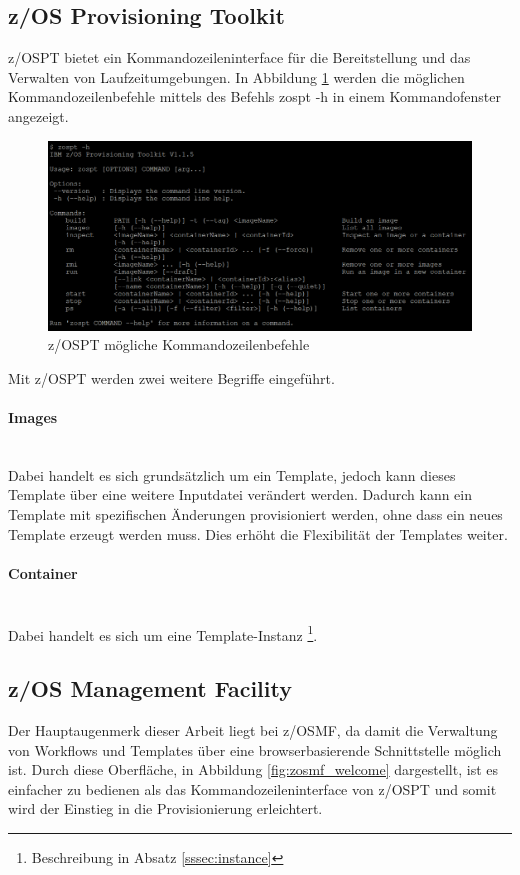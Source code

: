 \subsection{z/OS Provisioning Toolkit}\label{sssec:zospt}
z/OSPT bietet ein Kommandozeileninterface für die Bereitstellung und das Verwalten von Laufzeitumgebungen.
In Abbildung \ref{fig:zospt_help} werden die möglichen Kommandozeilenbefehle mittels des Befehls \glqq zospt -h\grqq{} in einem Kommandofenster angezeigt.
\begin{figure}[h]
	\centering
	\includegraphics[width=\textwidth]{figures/zospt_help_putty.png}
	\caption{z/OSPT mögliche Kommandozeilenbefehle}
	\label{fig:zospt_help}
\end{figure}
Mit z/OSPT werden zwei weitere Begriffe eingeführt.\\
\paragraph{\glqq Images\grqq}~\\
Dabei handelt es sich grundsätzlich um ein Template, jedoch kann dieses Template über eine weitere Inputdatei verändert werden.
Dadurch kann ein Template mit spezifischen Änderungen provisioniert werden, ohne dass ein neues Template erzeugt werden muss.
Dies erhöht die Flexibilität der Templates weiter.

\paragraph{\glqq Container\grqq}~\\
Dabei handelt es sich um eine Template-Instanz \footnote{Beschreibung in Absatz \ref{sssec:instance}}.
\cite{IBM.2019b}

\subsection{z/OS Management Facility}\label{sssec:zosmf}
Der Hauptaugenmerk dieser Arbeit liegt  bei z/OSMF, da damit die Verwaltung von Workflows und Templates über eine browserbasierende Schnittstelle möglich ist.
Durch diese Oberfläche, in Abbildung \ref{fig:zosmf_welcome} dargestellt, ist es einfacher zu bedienen als das Kommandozeileninterface von z/OSPT  und somit wird der Einstieg in die Provisionierung erleichtert.

